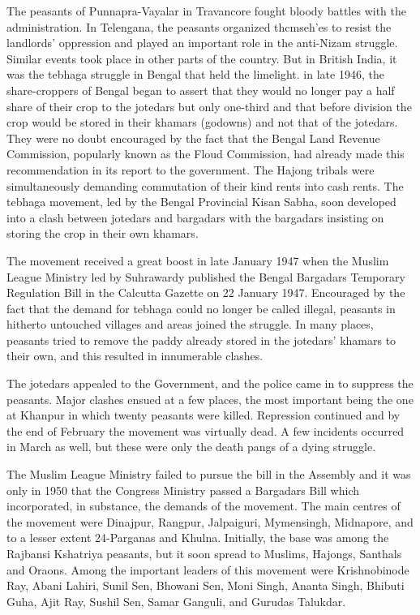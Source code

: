 The peasants of Punnapra-Vayalar in Travancore fought bloody battles with the administration. In Telengana, the peasants organized thcmseh'es to resist the landlords' oppression and played an important role in the anti-Nizam struggle. Similar events took place in other parts of the country. But in British India, it was the tebhaga struggle in Bengal that held the limelight. in late 1946, the share-croppers of Bengal began to assert that they would no longer pay a half share of their crop to the jotedars but only one-third and that before division the crop would be stored in their khamars (godowns) and not that of the jotedars. They were no doubt encouraged by the fact that the Bengal Land Revenue Commission, popularly known as the Floud Commission, had already made this recommendation in its report to the government. The Hajong tribals were simultaneously demanding commutation of their kind rents into cash rents. The tebhaga movement, led by the Bengal Provincial Kisan Sabha, soon developed into a clash between jotedars and bargadars with the bargadars insisting on storing the crop in their own khamars.

The movement received a great boost in late January 1947 when the Muslim League Ministry led by Suhrawardy published the Bengal Bargadars Temporary Regulation Bill in the Calcutta Gazette on 22 January 1947. Encouraged by the fact that the demand for tebhaga could no longer be called illegal, peasants in hitherto untouched villages and areas joined the struggle. In many places, peasants tried to remove the paddy already stored in the jotedars' khamars to their own, and this resulted in innumerable clashes.

The jotedars appealed to the Government, and the police came in to suppress the peasants. Major clashes ensued at a few places, the most important being the one at Khanpur in which twenty peasants were killed. Repression continued and by the end of February the movement was virtually dead. A few incidents occurred in March as well, but these were only the death pangs of a dying struggle.

The Muslim League Ministry failed to pursue the bill in the Assembly and it was only in 1950 that the Congress Ministry passed a Bargadars Bill which incorporated, in substance, the demands of the movement. The main centres of the movement were Dinajpur, Rangpur, Jalpaiguri, Mymensingh, Midnapore, and to a lesser extent 24-Parganas and Khulna. Initially, the base was among the Rajbansi Kshatriya peasants, but it soon spread to Muslims, Hajongs, Santhals and Oraons. Among the important leaders of this movement were Krishnobinode Ray, Abani Lahiri, Sunil Sen, Bhowani Sen, Moni Singh, Ananta Singh, Bhibuti Guha, Ajit Ray, Sushil Sen, Samar Ganguli, and Gurudas Talukdar.

